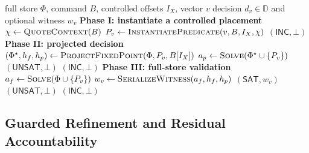 \begin{algorithm}[!t]
\caption{Source-projected vector decision}
\label{alg:projection}
\small
\begin{algorithmic}[1]
\Require full store $\Phi$, command $B$, controlled offsets $I_X$, vector $v$
\Ensure decision $d_v\in\mathbb{D}$ and optional witness $w_v$
\Statex \textbf{Phase I: instantiate a controlled placement}
\State $\chi\gets\Call{QuoteContext}{B}$
\State $P_v\gets\Call{InstantiatePredicate}{v,B,I_X,\chi}$
  \State \Return $(\mathsf{INC},\bot)$
\EndIf
\Statex \textbf{Phase II: projected decision}
\State $(\Phi^\star,h_f,h_p)\gets\Call{ProjectFixedPoint}{\Phi,P_v,B[I_X]}$
\State $a_p\gets\Call{Solve}{\Phi^\star\cup\{P_v\}}$
  \State \Return $(\mathsf{UNSAT},\bot)$
  \State \Return $(\mathsf{INC},\bot)$
\EndIf
\Statex \textbf{Phase III: full-store validation}
\State $a_f\gets\Call{Solve}{\Phi\cup\{P_v\}}$
  \State $w_v\gets\Call{SerializeWitness}{a_f,h_f,h_p}$
  \State \Return $(\mathsf{SAT},w_v)$
  \State \Return $(\mathsf{UNSAT},\bot)$
\Else
  \State \Return $(\mathsf{INC},\bot)$
\EndIf
\end{algorithmic}
\end{algorithm}

\subsection{Guarded Refinement and Residual Accountability}
\label{sec:refinement}

